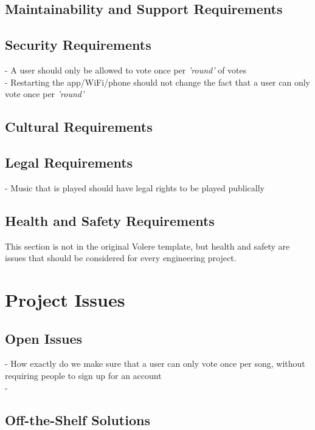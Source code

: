 \documentclass[12pt, titlepage]{article}
\begin{document}
\subsection{Maintainability and Support Requirements}

\subsection{Security Requirements}

- A user should only be allowed to vote once per \textit{'round'} of votes \\
- Restarting the app/WiFi/phone should not change the fact that a user can only
  vote once per \textit{'round'} \\

\subsection{Cultural Requirements}

\subsection{Legal Requirements}
- Music that is played should have legal rights to be played publically \\
\subsection{Health and Safety Requirements}

This section is not in the original Volere template, but health and safety are
issues that should be considered for every engineering project.

\section{Project Issues}

\subsection{Open Issues}

- How exactly do we make sure that a user can only vote once per song, without
  requiring people to sign up for an account \\
- 
\subsection{Off-the-Shelf Solutions}
\end{document}
